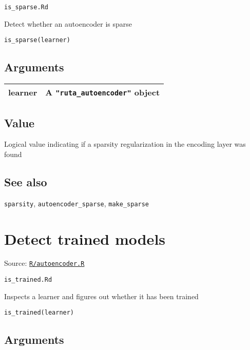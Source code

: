 \texttt{is\_sparse.Rd}

Detect whether an autoencoder is sparse

\begin{verbatim}
is_sparse(learner)
\end{verbatim}

\hypertarget{arguments}{\subsection{\texorpdfstring{\protect\hyperlink{arguments}{}Arguments}{Arguments}}\label{arguments}}

\begin{longtable}[c]{@{}ll@{}}
\toprule
learner & A \texttt{"ruta\_autoencoder"} object\tabularnewline
\bottomrule
\end{longtable}

\hypertarget{value}{\subsection{\texorpdfstring{\protect\hyperlink{value}{}Value}{Value}}\label{value}}

Logical value indicating if a sparsity regularization in the encoding
layer was found

\hypertarget{see-also}{\subsection{\texorpdfstring{\protect\hyperlink{see-also}{}See
also}{See also}}\label{see-also}}

\texttt{sparsity}, \texttt{autoencoder\_sparse}, \texttt{make\_sparse}

\section{Detect trained models}\label{detect-trained-models}

Source:
\href{https://github.com/fdavidcl/ruta/blob/master/R/autoencoder.R}{\texttt{R/autoencoder.R}}

\texttt{is\_trained.Rd}

Inspects a learner and figures out whether it has been trained

\begin{verbatim}
is_trained(learner)
\end{verbatim}

\hypertarget{arguments}{\subsection{\texorpdfstring{\protect\hyperlink{arguments}{}Arguments}{Arguments}}\label{arguments}}

